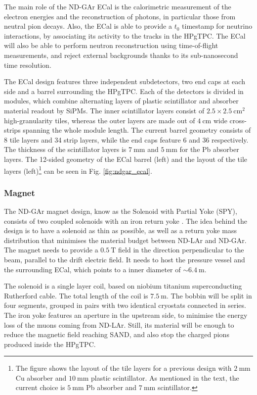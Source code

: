 The main role of the ND-GAr ECal is the calorimetric measurement of the electron energies and the reconstruction of photons, in particular those from neutral pion decays. Also, the ECal is able to provide a $t_{0}$ timestamp for neutrino interactions, by associating its activity to the tracks in the HPgTPC. The ECal will also be able to perform neutron reconstruction using time-of-flight measurements, and reject external backgrounds thanks to its sub-nanosecond time resolution.

The ECal design features three independent subdetectors, two end caps at each side and a barrel surrounding the HPgTPC. Each of the detectors is divided in modules, which combine alternating layers of plastic scintillator and absorber material readout by SiPMs. The inner scintillator layers consist of $2.5\times2.5~\mathrm{cm}^{2}$ high-granularity tiles, whereas the outer layers are made out of $4~\mathrm{cm}$ wide cross-strips spanning the whole module length. The current barrel geometry consists of 8 tile layers and 34 strip layers, while the end caps feature 6 and 36 respectively. The thickness of the scintillator layers is $7~\mathrm{mm}$ and $5~\mathrm{mm}$ for the Pb absorber layers. The 12-sided geometry of the ECal barrel (left) and the layout of the tile layers (left)\footnote{The figure shows the layout of the tile layers for a previous design with $2~\mathrm{mm}$ Cu absorber and $10~\mathrm{mm}$ plastic scintillator. As mentioned in the text, the current choice is $5~\mathrm{mm}$ Pb absorber and $7~\mathrm{mm}$ scintillator.} can be seen in Fig. \ref{fig:ndgar_ecal}.

\subsubsection{Magnet}

The ND-GAr magnet design, know as the Solenoid with Partial Yoke (SPY), consists of two coupled solenoids with an iron return yoke \cite{DUNESPY2023}. The idea behind the design is to have a solenoid as thin as possible, as well as a return yoke mass distribution that minimises the material budget between ND-LAr and ND-GAr. The magnet needs to provide a $0.5~\mathrm{T}$ field in the direction perpendicular to the beam, parallel to the drift electric field. It needs to host the pressure vessel and the surrounding ECal, which points to a inner diameter of $\sim6.4~\mathrm{m}$.

The solenoid is a single layer coil, based on niobium titanium superconducting Rutherford cable. The total length of the coil is $7.5~\mathrm{m}$. The bobbin will be split in four segments, grouped in pairs with two identical cryostats connected in series. The iron yoke features an aperture in the upstream side, to minimise the energy loss of the muons coming from ND-LAr. Still, its material will be enough to reduce the magnetic field reaching SAND, and also stop the charged pions produced inside the HPgTPC.

